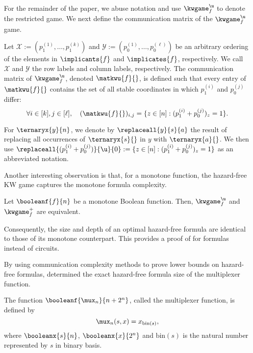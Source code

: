 \documentclass[acmsmall, nonacm, authorversion]{acmart}
\begin{document}
For the remainder of the paper, we abuse notation and use $\kwgame^{\u}_f$ to denote the restricted game. We next define the communication matrix of the $\kwgame_f^\u$ game.

\begin{definition}
    \label{def:communication-matrix-kwu}
Let $\mathcal{X}:=(p_1^{(1)},\dots,p_1^{(k)})$ and $\mathcal{Y}:=(p_0^{(1)},\dots,p_0^{(\ell)})$ be an arbitrary ordering of the elements in $\implicants{{f}}$ and $\implicates{f}$, respectively. We call $\mathcal{X}$ and $\mathcal{Y}$ the row labels and column labels, respectively. The communication matrix of $\kwgame_f^\u$, denoted $\matkwu{f}{}$, is defined such that every entry of $\matkwu{f}{}$ contains the set of all stable coordinates in which $p_1^{(i)}$ and $p_0^{(j)}$ differ:
\[
    \forall i\in [k], j\in [\ell], \quad (\matkwu{f}{})_{i,j}=\{z\in [n]: (p_1^{(i)} + p_0^{(j)})_{z}=1\}.
\]

For $\ternaryx{y}{n}$, we denote by $\replaceall{y}{s}{a}$ the result of replacing all occurrences of $\ternaryx{s}{}$ in $y$ with $\ternaryx{a}{}$. We then use $\replaceall{(p_1^{(i)} + p_0^{(j)})}{\u}{0}:=\{z\in [n]: (p_1^{(i)} + p_0^{(j)})_{z}=1\}$ as an abbreviated notation. 
\end{definition}

Another interesting observation is that, for a monotone function, the hazard-free KW game captures the monotone formula complexity.

\begin{theorem}[{\cite[Theorem 11]{IK23}}]\label{thm:kw-hazard-free-monotone}
Let $\booleanf{f}{n}$ be a monotone Boolean function. Then, $\kwgame_{f}^{\u}$ and $\kwgame_{f}^{+}$ are equivalent. 
\end{theorem}

Consequently, the size and depth of an optimal hazard-free formula are identical to those of its monotone counterpart. This provides a proof of  for formulas instead of circuits. 

By using communication complexity methods to prove lower bounds on hazard-free formulas, \cite[Theorems 19, 23]{IK23} determined the exact hazard-free formula size of the multiplexer function.

\begin{definition}\label{def:mux}
The function $\booleanf{\mux_n}{n+2^n}$, called the multiplexer function, is defined by
\[
\mux_n(s,x)=x_{\text{bin}(s)},
\]
where $\booleanx{s}{n}$, $\booleanx{x}{2^n}$ and $\text{bin}(s)$ is the natural number represented by $s$ in binary basis. 
\end{definition}
\end{document}
